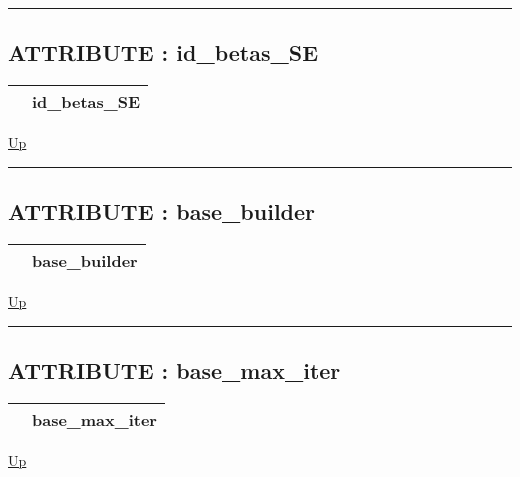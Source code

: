 \par


\rule{\textwidth}{0.4pt}
\subsection*{ATTRIBUTE : id\_betas\_SE}
\hypertarget{ecldoc:logisticregression.constants.id_betas_se}{}

{\renewcommand{\arraystretch}{1.5}
\begin{tabularx}{\textwidth}{|>{\raggedright\arraybackslash}l|X|}
\hline
\hspace{0pt} & id\_betas\_SE \\
\hline
\end{tabularx}
}

\hyperlink{ecldoc:LogisticRegression.Constants}{Up}

\par


\rule{\textwidth}{0.4pt}
\subsection*{ATTRIBUTE : base\_builder}
\hypertarget{ecldoc:logisticregression.constants.base_builder}{}

{\renewcommand{\arraystretch}{1.5}
\begin{tabularx}{\textwidth}{|>{\raggedright\arraybackslash}l|X|}
\hline
\hspace{0pt} & base\_builder \\
\hline
\end{tabularx}
}

\hyperlink{ecldoc:LogisticRegression.Constants}{Up}

\par


\rule{\textwidth}{0.4pt}
\subsection*{ATTRIBUTE : base\_max\_iter}
\hypertarget{ecldoc:logisticregression.constants.base_max_iter}{}

{\renewcommand{\arraystretch}{1.5}
\begin{tabularx}{\textwidth}{|>{\raggedright\arraybackslash}l|X|}
\hline
\hspace{0pt} & base\_max\_iter \\
\hline
\end{tabularx}
}

\hyperlink{ecldoc:LogisticRegression.Constants}{Up}

